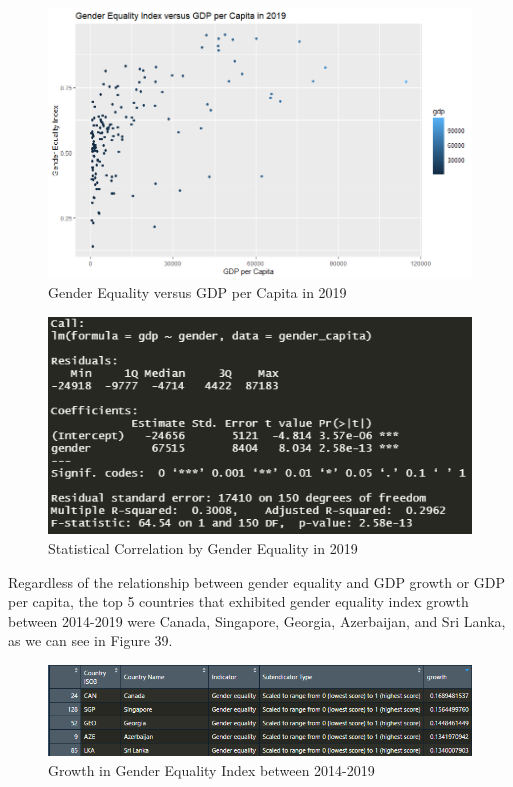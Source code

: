 \documentclass[15pt]{article}
\begin{document}
\begin{figure}[H]
    \centering
    \includegraphics[scale = 0.5]{Part7_gender_capita.png}
    \caption{Gender Equality versus GDP per Capita in 2019}
\end{figure}

\begin{figure}[H]
    \centering
    \includegraphics[scale = 0.65]{Part7_gender_capita_r^2.PNG}
    \caption{Statistical Correlation by Gender Equality in 2019}
\end{figure}

\noindent Regardless of the relationship between gender equality and GDP growth or GDP per capita, the top 5 countries that exhibited gender equality index growth between 2014-2019 were Canada, Singapore, Georgia, Azerbaijan, and Sri Lanka, as we can see in Figure 39.

\begin{figure}[H]
    \centering
    \includegraphics[scale = 0.7]{Part7_growth.PNG}
    \caption{Growth in Gender Equality Index between 2014-2019}
\end{figure}
\end{document}

